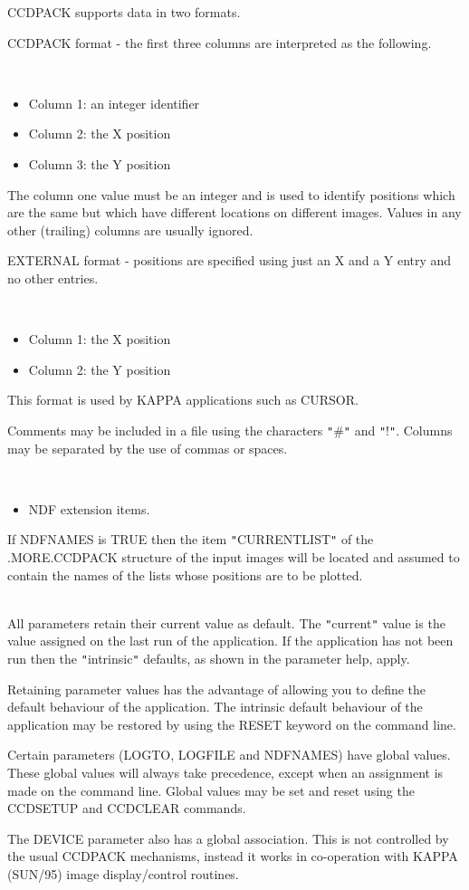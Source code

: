 \documentclass[twoside,11pt]{article}
\newcommand{\htmlref}[2]{#1}
\newcommand{\xref}[3]{#1}
\renewcommand{\_}{\texttt{\symbol{95}}}
\newcommand{\qt}[1]{{\tt "}#1{\tt "}}
\newcommand{\xroutine}[1]{\htmlref{{\sc #1}}{#1}}
\newcommand{\sstdiytopic}[2]{\item[#1:] \mbox{} \\[1.3ex] #2}
\newcommand{\sstitemlist}[1]{
  \mbox{} \\
  \vspace{-3.5ex}
  \begin{itemize}
     #1
  \end{itemize}
}
\newcommand{\sstitem}{\item}
\newcommand{\sstdiytopic}[2]{\item[{#1:}] #2 }
\newcommand{\sstitemlist}[1]{
      \begin{itemize}
         #1
      \end{itemize}
      \\
   }
\newcommand{\sstitem}{\item}
\begin{document}
{{{             CCDPACK supports data in two formats.

             CCDPACK format - the first three columns are interpreted as the
             following.

             \sstitemlist{

                \sstitem
                  Column 1: an integer identifier

                \sstitem
                  Column 2: the X position

                \sstitem
                  Column 3: the Y position
             }
             The column one value must be an integer and is used to identify
             positions which are the same but which have different locations
             on different images. Values in any other (trailing) columns are
             usually ignored.

             EXTERNAL format - positions are specified using just an X and
             a Y entry and no other entries.
             \sstitemlist{

                \sstitem
                  Column 1: the X position

                \sstitem
                  Column 2: the Y position

            }
            This format is used by KAPPA applications such as
            \xref{CURSOR}{sun95}{CURSOR}.

            Comments may be included in a file using the characters \qt{\#} and
            \qt{!}. Columns may be separated by the use of commas or spaces.

            \sstitemlist{

               \sstitem
                 NDF extension items.

           }
           If NDFNAMES is TRUE then the item \qt{CURRENT\_LIST} of the
           .MORE.CCDPACK structure of the input images will be located
           and assumed to contain the names of the lists whose positions
           are to be plotted.
     }
   }
   \sstdiytopic{
      Behaviour of parameters
   } {
      All parameters retain their current value as default. The
      \qt{current} value is the value assigned on the last run of the
      application. If the application has not been run then the
      \qt{intrinsic} defaults, as shown in the parameter help, apply.

      Retaining parameter values has the advantage of allowing you to
      define the default behaviour of the application. The intrinsic
      default behaviour of the application may be restored by using the
      RESET keyword on the command line.

      Certain parameters (LOGTO, LOGFILE and NDFNAMES) have global
      values. These global values will always take precedence, except
      when an assignment is made on the command line. Global values may
      be set and reset using the \xroutine{CCDSETUP} and \xroutine{CCDCLEAR} commands.

      The DEVICE parameter also has a global association. This is not
      controlled by the usual CCDPACK mechanisms, instead it works in
      co-operation with \xref{KAPPA (SUN/95)}{sun95}{} image
      display/control routines.
   }
}
\end{document}
